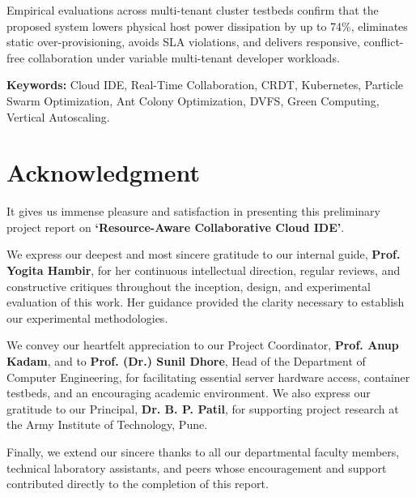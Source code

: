 \documentclass[12pt,a4paper]{report}
\begin{document}
Empirical evaluations across multi-tenant cluster testbeds confirm that the proposed system lowers physical host power dissipation by up to 74\%, eliminates static over-provisioning, avoids SLA violations, and delivers responsive, conflict-free collaboration under variable multi-tenant developer workloads.

\vspace{0.4cm}
\textbf{Keywords:} Cloud IDE, Real-Time Collaboration, CRDT, Kubernetes, Particle Swarm Optimization, Ant Colony Optimization, DVFS, Green Computing, Vertical Autoscaling.

\clearpage
\chapter*{Acknowledgment}
\thispagestyle{plain}

\noindent
It gives us immense pleasure and satisfaction in presenting this preliminary project report on \textbf{`Resource-Aware Collaborative Cloud IDE'}.

\vspace{0.4cm}
We express our deepest and most sincere gratitude to our internal guide, \textbf{Prof. Yogita Hambir}, for her continuous intellectual direction, regular reviews, and constructive critiques throughout the inception, design, and experimental evaluation of this work. Her guidance provided the clarity necessary to establish our experimental methodologies.

\vspace{0.4cm}
We convey our heartfelt appreciation to our Project Coordinator, \textbf{Prof. Anup Kadam}, and to \textbf{Prof. (Dr.) Sunil Dhore}, Head of the Department of Computer Engineering, for facilitating essential server hardware access, container testbeds, and an encouraging academic environment. We also express our gratitude to our Principal, \textbf{Dr. B. P. Patil}, for supporting project research at the Army Institute of Technology, Pune.

\vspace{0.4cm}
Finally, we extend our sincere thanks to all our departmental faculty members, technical laboratory assistants, and peers whose encouragement and support contributed directly to the completion of this report.
\end{document}
